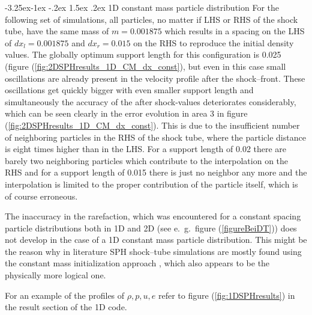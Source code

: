 \documentclass[11pt,a4paper,twoside]{report}
\makeatletter
\renewcommand\paragraph{\@startsection{paragraph}{4}{\z@}%
  {-3.25ex\@plus -1ex \@minus -.2ex}%
  {1.5ex \@plus .2ex}%
  {\normalfont\normalsize\bfseries}}
\makeatother
\begin{document}
   
\paragraph{1D constant mass particle distribution}
For the following set of simulations, all particles, no matter if LHS or RHS of the shock tube, have the same mass of $m=0.001875$ which results in a spacing on the LHS of $dx_l=0.001875$ and $dx_r=0.015$ on the RHS to reproduce the initial density values. 
The globally optimum support length for this configuration is 0.025 (figure (\ref{fig:2DSPHresults_1D_CM_dx_const}), but even in this case small oscillations are already present in the velocity profile after the shock--front. These oscillations get quickly bigger with even smaller support length and simultaneously the accuracy of the after shock-values deteriorates considerably, which can be seen clearly in the error evolution in area 3 in figure (\ref{fig:2DSPHresults_1D_CM_dx_const}). 
This is due to the insufficient number of neighboring particles in the RHS of the shock tube, where the particle distance is eight times higher than in the LHS. For a support length of 0.02 there are barely two neighboring particles which contribute to the interpolation on the RHS and for a support length of 0.015 there is just no neighbor any more and the interpolation is limited to the proper contribution of the particle itself, which is of course erroneous. 

The inaccuracy in the rarefaction, which was encountered for a constant spacing particle distributions both in 1D and 2D (see e.\ g.\ figure (\ref{figureBeiDT})) does not develop in the case of a 1D constant mass particle distribution. This might be the reason why 
in literature SPH shock--tube simulations are mostly found using the constant mass initialization approach \cite{Monaghan1983,Monaghan2005,Liu2003}, which also appears to be the physically more logical one.

For an example of the profiles of $\rho, p, u, e$ refer to figure (\ref{fig:1DSPHresults}) in the result section of the 1D code. 
\end{document}
